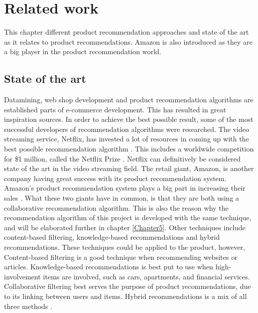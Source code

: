 
\chapter{Related work} %

\label{Chapter3} %

This chapter different product recommendation approaches and state of the art as it relates to product recommendations. Amazon is also introduced as they are a big player in the product recommendation world.

\section{State of the art}

Datamining, web shop development and product recommendation algorithms are established parts of e-commerce development. This has resulted in great inspiration sources. In order to achieve the best possible result, some of the most successful developers of recommendation algorithms were researched. The video streaming service, Netflix, has invested a lot of resources in coming up with the best possible recommendation algorithm \cite{Netflix}. This includes a worldwide competition for \$1 million, called the Netflix Prize \cite{NetflixPrize}. Netflix can definitively be considered state of the art in the video streaming field. The retail giant, Amazon, is another company having great success with its product recommendation system. Amazon's product recommendation system plays a big part in increasing their sales \cite{AmazonSuccess}. What these two giants have in common, is that they are both using a collaborative recommendation algorithm. This is also the reason why the recommendation algorithm of this project is developed with the same technique, and will be elaborated further in chapter \ref{Chapter5}. Other techniques include content-based filtering, knowledge-based recommendations and hybrid recommendations. These techniques could be applied to the product, however, Content-based filtering is a good technique when recommending websites or articles. Knowledge-based recommendations is best put to use when high-involvement items are involved, such as cars, apartments, and financial services. Collaborative filtering best serves the purpose of product recommendations, due to its linking between users and items. Hybrid recommendations is a mix of all three methods \cite{recommendationtechniques}.


